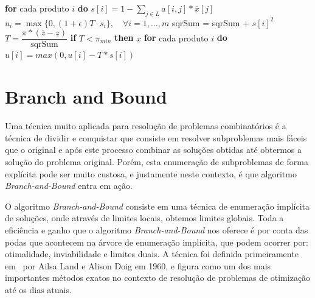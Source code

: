 \documentclass{article}
\newenvironment{algoritmo}[1][]
  {\begin{algorithm}[#1]
     \selectlanguage{brazil}%
     \floatname{algorithm}{Algoritmo}%
  }
  {\end{algorithm}}
\begin{document}
    \begin{algoritmo}[h]
        \begin{algorithmic}[1]
            \Statex
            \Statex {}
            \State \indent \textbf{for}{ cada produto $i$} \textbf{do}
            \State \indent \indent $s[i] = 1 - \sum_{j\in L} a[i,j]*\overline{x}[j]$
            \State \indent \indent $u_i = \max \{0,(1+ \epsilon) T \cdot s_i\}, \quad \forall i= 1,\dots,m$
            \State \indent \indent sqrSum = sqrSum + $s[i]^2$
            \State \indent$T = \dfrac{\pi * (\overline{z} - \underline{z})}{\text{sqrSum}} $
            \State \indent \textbf{if}{ $T < \pi_{min}$}\textbf{ then}
            \State \indent \indent \Return $\underline{x}$ 
            \State \indent \textbf{for} { cada produto $i$} \textbf{do}
            \State \indent \indent $u[i] = max(0, u[i] - T*s[i]) $
        \end{algorithmic}
    \end{algoritmo}
    

	\section{Branch and Bound}\label{sec:BB}
	Uma técnica muito aplicada para resolução de problemas combinatórios é a técnica de dividir e conquistar que consiste em resolver subproblemas mais fáceis que o original e após este processo combinar as soluções obtidas até obtermos a solução do problema original. Porém, esta enumeração de subproblemas de forma explícita pode ser muito custosa, e justamente neste contexto, é que algoritmo \emph{Branch-and-Bound} entra em ação.
	
	O algoritmo \emph{Branch-and-Bound} consiste em uma técnica de enumeração implícita de soluções, onde através de limites locais, obtemos limites globais. Toda a eficiência e ganho que o algoritmo \emph{Branch-and-Bound} nos oferece é por conta das podas que acontecem na árvore de enumeração implícita, que podem ocorrer por: otimalidade, inviabilidade e limites duais. A técnica foi definida primeiramente em~\cite{Land} por Ailsa Land e Alison Doig em 1960, e figura como um dos mais importantes métodos exatos no contexto de resolução de problemas de otimização até os dias atuais.
	
\end{document}
